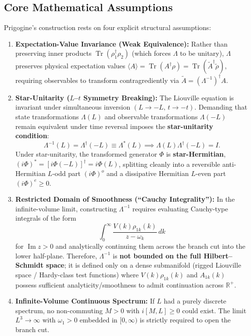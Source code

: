 \documentclass[11pt,a4paper]{article}
\begin{document}
\subsection{Core Mathematical Assumptions}
Prigogine's construction rests on four explicit structural assumptions:
\begin{enumerate}
    \item \textbf{Expectation-Value Invariance (Weak Equivalence):} Rather than preserving inner products $\operatorname{Tr}(\rho_1^\dagger \rho_2)$ (which forces $\Lambda$ to be unitary), $\Lambda$ preserves physical expectation values $\langle A \rangle = \operatorname{Tr}(A^\dagger \rho) = \operatorname{Tr}(\tilde{A}^\dagger \tilde{\rho})$, requiring observables to transform contragrediently via $\tilde{A} = (\Lambda^{-1})^\dagger A$.
    \item \textbf{Star-Unitarity ($L$--$t$ Symmetry Breaking):} The Liouville equation is invariant under simultaneous inversion $(L \to -L, \, t \to -t)$. Demanding that state transformations $\Lambda(L)$ and observable transformations $\Lambda(-L)$ remain equivalent under time reversal imposes the \textbf{star-unitarity condition}:
    \begin{equation}
    \Lambda^{-1}(L) = \Lambda^\dagger(-L) \equiv \Lambda^*(L) \implies \Lambda(L)\Lambda^\dagger(-L) = I.
    \end{equation}
    Under star-unitarity, the transformed generator $\Phi$ is \textbf{star-Hermitian}, $(i\Phi)^* = [i\Phi(-L)]^\dagger = i\Phi(L)$, splitting cleanly into a reversible anti-Hermitian $L$-odd part $(i\Phi)^o$ and a dissipative Hermitian $L$-even part $(i\Phi)^e \ge 0$.
    \item \textbf{Restricted Domain of Smoothness (``Cauchy Integrality''):} In the infinite-volume limit, constructing $\Lambda^{-1}$ requires evaluating Cauchy-type integrals of the form
    \begin{equation}
    \int_0^\infty \frac{V(k)\rho_{1k}(k)}{z - \omega_k} \, dk
    \end{equation}
    for $\operatorname{Im} z > 0$ and analytically continuing them across the branch cut into the lower half-plane. Therefore, $\Lambda^{-1}$ is \textbf{not bounded on the full Hilbert--Schmidt space}; it is defined only on a dense submanifold (rigged Liouville space / Hardy-class test functions) where $V(k)\rho_{1k}(k)$ and $A_{1k}(k)$ possess sufficient analyticity/smoothness to admit continuation across $\mathbb{R}^+$.
    \item \textbf{Infinite-Volume Continuous Spectrum:} If $L$ had a purely discrete spectrum, no non-commuting $M > 0$ with $i[M,L] \ge 0$ could exist. The limit $L^3 \to \infty$ with $\omega_1 > 0$ embedded in $[0, \infty)$ is strictly required to open the branch cut.
\end{enumerate}
\end{document}
